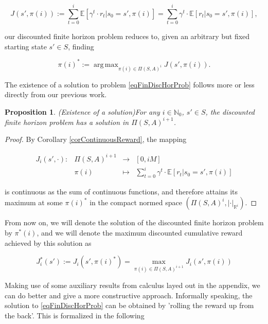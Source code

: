 \documentclass[11pt]{article} %
\newtheorem{prop}{Proposition}
\DeclareMathOperator*{\argmax}{arg\,max}
\begin{document}
\begin{equation}\label{eqFinDiscHorReward}
		J(s',\pi(i)) := \sum\limits_{t=0}^i \mathbb{E}[ \gamma^t \cdot r_t | s_0 = s', \pi(i)] = \sum\limits_{t=0}^i \gamma^t \cdot \mathbb{E}[ r_t | s_0 = s', \pi(i)],
\end{equation}

our discounted finite horizon problem reduces to, given an arbitrary but fixed starting state $s' \in S$, finding

\begin{equation}\label{eqFinDiscHorProb}
	\pi(i)^* := \argmax_{\pi(i) \in \Pi(S,A)^i} J(s',\pi(i)).
\end{equation}

The existence of a solution to problem \ref{eqFinDiscHorProb} follows more or less directly from our previous work.

\begin{prop}(Existence of a solution)\label{propExistenceFiniteSolution}
	For any $i \in \mathbb{N}_0$, $s' \in S$, the discounted finite horizon problem has a solution in $\Pi(S,A)^{i+1}$.
\end{prop}

\begin{proof}
By Corollary \ref{corContinuousReward}, the mapping 

\begin{equation}\label{contDiscExpRewSumMap}
	\begin{array}{rccl}
		J_i(s',\cdot): 	& \Pi(S,A)^{i+1} 	& \rightarrow 	& [0,i M] \\
					& \pi(i)		& \mapsto 	& \sum\limits_{t=0}^i \gamma^t \cdot \mathbb{E}[ r_t | s_0 = s', \pi(i)]
	\end{array}
\end{equation}

is continuous as the sum of continuous functions, and therefore attains its maximum at some $\pi(i)^*$ in the compact normed space $(\Pi(S,A)^i,|\cdot|_{\mathbb{R}^i})$.
\end{proof}

From now on, we will denote the solution of the discounted finite horizon problem by $\pi^*(i)$, and we will denote the maximum discounted cumulative reward achieved by this solution as 

\begin{equation}
	J_i^*(s') := J_i(s',\pi(i)^*) = \max\limits_{\pi(i) \in \Pi(S,A)^{i+1}} J_i(s',\pi(i))
\end{equation}

Making use of some auxiliary results from calculus layed out in the appendix, we can do better and give a more constructive approach. Informally speaking, the solution to \ref{eqFinDiscHorProb} can be obtained by 'rolling the reward up from the back'. This is formalized in the following
\end{document}
